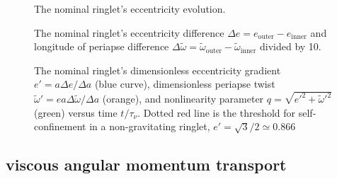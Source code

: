 \documentclass[preprint]{aastex62}
\begin{document}
\begin{figure}
\caption{
\label{fig:e_nominal}
The nominal ringlet's eccentricity evolution.}
\end{figure}

\begin{figure}
    \caption{
        \label{fig:de_nominal}
        The nominal ringlet's eccentricity difference $\Delta e = e_{\text{outer}} - e_{\text{inner}}$
        and longitude of periapse difference
        $\Delta\tilde{\omega} = \tilde{\omega}_{\text{outer}} - \tilde{\omega}_{\text{inner}}$
        divided by 10.
    }
\end{figure}

\begin{figure}
    \caption{
        \label{fig:de_prime_nominal}
        The nominal ringlet's dimensionless eccentricity gradient $e' = a\Delta e/\Delta a$
        (blue curve), dimensionless periapse twist $\tilde{\omega}' = ea\Delta\tilde{\omega}/\Delta a$
        (orange), and nonlinearity parameter $q=\sqrt{e'^2 + \tilde{\omega}'^2}$
        (green) versus time $t/\tau_\nu$. Dotted red line 
        is the threshold for self-confinement in a non-gravitating ringlet, $e'=\sqrt{3}/2\simeq0.866$
    }
\end{figure}\vfil


\subsection{viscous angular momentum transport}
\label{subsec:viscous_flux}
\end{document}
